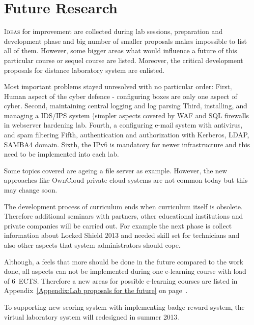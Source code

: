 \chapter{Future Research}
\label{Future Research}

\lettrine[lraise=0.1, nindent=0em, slope=-.5em]{\color{Violet}I}{deas} for improvement are collected during lab sessions, preparation and development phase and big number of smaller proposals makes impossible to list all of them. However, some bigger areas what would influence a future of this particular course or sequel course are listed. Moreover, the critical development proposals for distance laboratory system are enlisted.

Most important problems stayed unresolved with no particular order:
First, Human aspect of the cyber defence - configuring boxes are only one aspect of cyber. 
Second, maintaining central logging and log parsing
Third, installing, and managing a \gls{IDS}/\gls{IPS} system (simpler aspects covered by  \gls{WAF} and \gls{SQL} firewalls in webserver hardening lab.
Fourth, a configuring e-mail system with antivirus, and spam filtering
Fifth, authentication and authorization with Kerberos, LDAP, SAMBA4 domain.
Sixth, the IPv6 is mandatory for newer infrastructure and this need to be implemented into each lab.

Some topics covered are ageing a file server as example. However, the new approaches like OwnCloud private cloud systems are not common today but this may change soon.

The development process of curriculum ends when curriculum itself is obsolete. Therefore additional seminars with partners, other educational institutions and private companies will be carried out. For example the next phase is collect information about Locked Shield 2013 and needed skill set for technicians and also other aspects that system administrators should cope.

Although, a feels that more should be done in the future compared to the work done, all aspects can not be implemented during one e-learning course with load of 6~\gls{ECTS}. Therefore a new areas for possible e-learning courses are listed in Appendix~\ref{Appendix:Lab proposals for the future} on page~\pageref{Appendix:Lab proposals for the future}.

To supporting new scoring system with implementing badge reward system, the virtual laboratory system will redesigned in summer 2013.